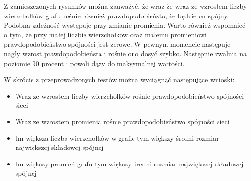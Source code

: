 	Z zamieszczonych rysunków można zauważyć, że wraz że wraz ze wzrostem liczby wierzchołków grafu rośnie również prawdopodobieństo, że będzie on spójny. Podobna zależność występuje przy zmianie promienia. Warto również wspomnieć o tym, że przy małej liczbie wierzchołków oraz małemu promieniowi prawdopodobieństwo spójności jest zerowe. W pewnym momencie następuje nagły wzrost prawdopodobieństa i rośnie ono dosyć szybko. Następnie zwalnia na poziomie 90 procent i powoli dąży do maksymalnej wartości.

	W skrócie z przeprowadzonych testów można wyciągnąć następujące wnioski:
	\begin{itemize}
		\item Wraz ze wzrostem liczby wierzchołków rośnie prawdopodobieństwo spójności sieci
		\item Wraz ze wzrostem promienia rośnie prawdopodobieństwo spójności sieci
		\item Im większa liczba wierzchołków w grafie tym większy średni rozmiar największej składowej spójnej
		\item Im większy promień grafu tym większy średni rozmiar największej składowej spójnej	
	\end{itemize}
